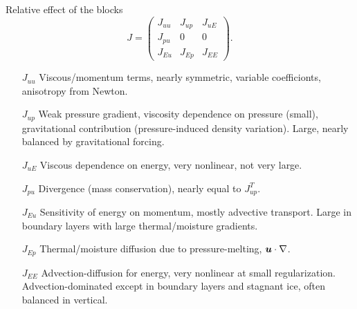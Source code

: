\begin{frame}{Relative effect of the blocks}
  \begin{equation*}\label{eq:vhtblock}
    J =
    \begin{pmatrix}
      J_{uu} & J_{up} & J_{uE} \\
      J_{pu} & 0 & 0 \\
      J_{Eu} & J_{Ep} & J_{EE}
    \end{pmatrix} .
  \end{equation*}
  \begin{itemize}
  \item[$J_{uu}$] Viscous/momentum terms, nearly symmetric, variable coefficionts, anisotropy from Newton.
  \item[$J_{up}$] Weak pressure gradient, viscosity dependence on pressure (small), gravitational contribution (pressure-induced density variation).
    Large, nearly balanced by gravitational forcing.
  \item[$J_{uE}$] Viscous dependence on energy, very nonlinear, not very large.
  \item[$J_{pu}$] Divergence (mass conservation), nearly equal to $J_{up}^T$.
  \item[$J_{Eu}$] Sensitivity of energy on momentum, mostly advective transport.
    Large in boundary layers with large thermal/moisture gradients.
  \item[$J_{Ep}$] Thermal/moisture diffusion due to pressure-melting, $\bm u \cdot \nabla$.
  \item[$J_{EE}$] Advection-diffusion for energy, very nonlinear at small regularization.
    Advection-dominated except in boundary layers and stagnant ice, often balanced in vertical.
  \end{itemize}
\end{frame}


